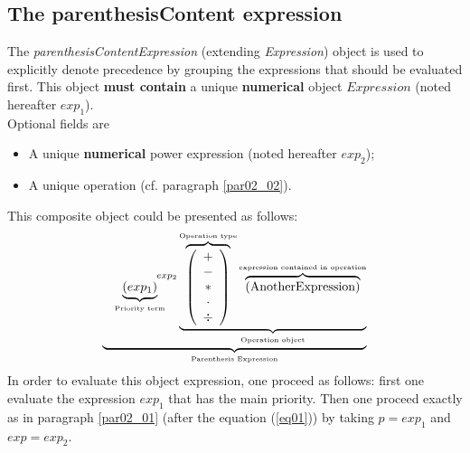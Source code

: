\documentclass[a4paper,11pt] {article}
\begin{document}
\subsection{The parenthesisContent expression}\label{par02_04}
The {\it parenthesisContentExpression} (extending {\it Expression}) object is used to explicitly denote precedence by grouping the expressions that should be evaluated first. This object {\bf must contain} a unique {\bf numerical} object $Expression$ (noted hereafter $exp_1$).\\
Optional fields are 
\begin{itemize}
\item A unique {\bf numerical} power expression (noted hereafter $exp_2$);
\item A unique operation (cf. paragraph \ref{par02_02}).\\
\end{itemize}
This composite object could be presented as follows:
\begin{equation}
 \underbrace{    \underbrace{ \left( exp_1\right) }_{\mbox{\tiny Priority term}} ^{\hspace{15mm}exp_2} \underbrace{  \overbrace{\left( \begin{array}{c} + \\ - \\ \ast  \\ \cdot \\ \div   \end{array} \right) }^{\mbox{\tiny Operation type}}
 \overbrace{    \left( \mbox{AnotherExpression}\right) }^{\mbox{\tiny expression contained in operation}}   }_{\mbox{\tiny Operation object}}}_{\mbox{\tiny Parenthesis Expression}}
\end{equation}
In order to evaluate this object expression, one proceed as follows: first one evaluate the expression $exp_1$ that has the main priority. Then one proceed exactly as in paragraph \ref{par02_01} (after the equation (\ref{eq01})) by taking $p=exp_1$ and $exp=exp_2$.


\end{document}
